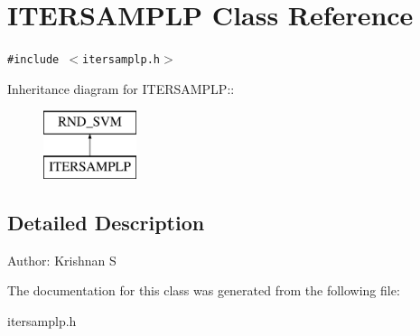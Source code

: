 \section{ITERSAMPLP Class Reference}
\label{classITERSAMPLP}
{\tt \#include $<$itersamplp.h$>$}

Inheritance diagram for ITERSAMPLP::\begin{figure}[H]
\begin{center}
\leavevmode
\includegraphics[height=2cm]{classITERSAMPLP}
\end{center}
\end{figure}


\subsection{Detailed Description}
\begin{Desc}
\item[Author:]Krishnan S \end{Desc}




The documentation for this class was generated from the following file:\begin{CompactItemize}
\item 
itersamplp.h\end{CompactItemize}
